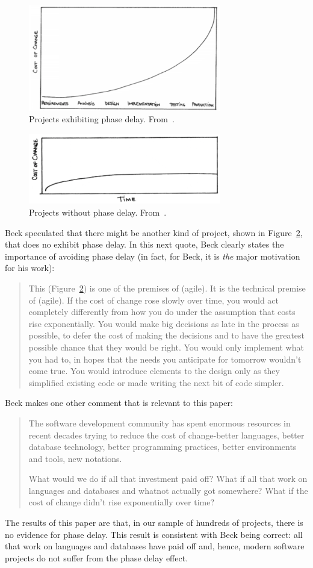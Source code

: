 \documentclass{sig-alternate}
\newcommand{\fig}[1]{Figure~\ref{fig:#1}}
\begin{document}
\begin{figure}
 \includegraphics[width=3.3in]{beckB4.png}
 \caption{Projects exhibiting phase delay. From~\cite{beck00}.}\label{fig:curve1}
 \end{figure}
\begin{figure}
 \includegraphics[width=3.3in]{beckAFTER.png}
 \caption{Projects without   phase delay. From~\cite{beck00}.}\label{fig:curve2}
\end{figure}
 
Beck speculated that there might be another kind of project, shown in \fig{curve2},
that does no exhibit phase delay. In this next quote, Beck clearly states
the importance of avoiding phase delay (in fact, for Beck, it is {\em the} major
motivation for his work):
\begin{quote}
This (\fig{curve2}) is one of the premises of (agile). It is the technical premise of (agile). If the cost of change rose slowly over time, you would act completely differently from how you do under the assumption that costs rise exponentially. You would make big decisions as late in the process as possible, to defer the cost of making the decisions and to have the greatest possible chance that they would be right. You would only implement what you had to, in hopes that the needs you anticipate for tomorrow wouldn't come true. You would introduce elements to the design only as they simplified existing code or made writing the next bit of code simpler.~\cite{beck00}
\end{quote}
Beck makes one other comment that is relevant to this paper: 
\begin{quote}
The software development community has spent enormous resources in recent decades trying to reduce the cost of change-better languages, better database technology, better programming practices, better environments and tools, new notations.

What would we do if all that investment paid off? What if all that work on languages and databases and whatnot actually got somewhere? What if the cost of change didn't rise exponentially over time?~\cite{beck00}
\end{quote}
The results of this paper are that, in our sample of hundreds of projects, there is no evidence for phase delay.
This result is   consistent with Beck being correct: all that work on    languages and databases
have paid off and, hence, modern software projects do not suffer from the  phase delay effect.  
\end{document}
